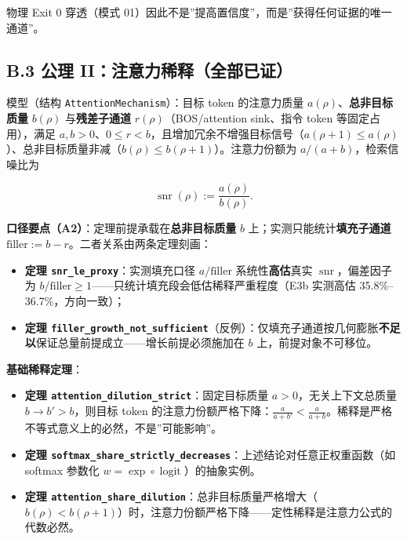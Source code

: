 物理 Exit 0 穿透（模式
01）因此不是''提高置信度''，而是''获得任何证据的唯一通道''。

\subsection{B.3 公理
II：注意力稀释（全部已证）}\label{b.3-ux516cux7406-iiux6ce8ux610fux529bux7a00ux91caux5168ux90e8ux5df2ux8bc1}

模型（结构 \texttt{AttentionMechanism}）：目标 token 的注意力质量
\(a(\rho)\)、\textbf{总非目标质量} \(b(\rho)\) 与\textbf{残差子通道}
\(r(\rho)\)（BOS/attention sink、指令 token 等固定占用），满足
\(a,b>0\)、\(0\le r<b\)，且增加冗余不增强目标信号（\(a(\rho+1)\le a(\rho)\)）、总非目标质量非减（\(b(\rho)\le b(\rho+1)\)）。注意力份额为
\(a/(a+b)\)，检索信噪比为

\[\operatorname{snr}(\rho) := \frac{a(\rho)}{b(\rho)}.\]

\textbf{口径要点（A2）}：定理前提承载在\textbf{总非目标质量} \(b\)
上；实测只能统计\textbf{填充子通道}
\(\mathrm{filler} := b - r\)。二者关系由两条定理刻画：

\begin{itemize}
\tightlist
\item
  \textbf{定理 \texttt{snr\_le\_proxy}}：实测填充口径
  \(a/\mathrm{filler}\) 系统性\textbf{高估}真实
  \(\operatorname{snr}\)，偏差因子为
  \(b/\mathrm{filler}\ge 1\)------只统计填充段会低估稀释严重程度（E3b
  实测高估 35.8\%--36.7\%，方向一致）；
\item
  \textbf{定理
  \texttt{filler\_growth\_not\_sufficient}}（反例）：仅填充子通道按几何膨胀\textbf{不足以}保证总量前提成立------增长前提必须施加在
  \(b\) 上，前提对象不可移位。
\end{itemize}

\textbf{基础稀释定理}：

\begin{itemize}
\tightlist
\item
  \textbf{定理 \texttt{attention\_dilution\_strict}}：固定目标质量
  \(a>0\)，无关上下文总质量 \(b \to b' > b\)，则目标 token
  的注意力份额严格下降：\(\frac{a}{a+b'} < \frac{a}{a+b}\)。稀释是严格不等式意义上的必然，不是''可能影响''。
\item
  \textbf{定理
  \texttt{softmax\_share\_strictly\_decreases}}：上述结论对任意正权重函数（如
  softmax 参数化 \(w = \exp \circ \operatorname{logit}\)）的抽象实例。
\item
  \textbf{定理
  \texttt{attention\_share\_dilution}}：总非目标质量严格增大（\(b(\rho) < b(\rho+1)\)）时，注意力份额严格下降------定性稀释是注意力公式的代数必然。
\end{itemize}

